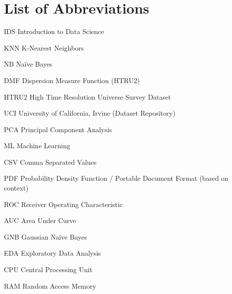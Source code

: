 \chapter*{List of Abbreviations}

\begin{abbrv}

    \item[IDS]        Introduction to Data Science
    \item[KNN]        K-Nearest Neighbors
    \item[NB]         Naïve Bayes
    \item[DMF]        Dispersion Measure Function (HTRU2)
    \item[HTRU2]      High Time Resolution Universe Survey Dataset
    \item[UCI]        University of California, Irvine (Dataset Repository)
    \item[PCA]        Principal Component Analysis
    \item[ML]         Machine Learning
    \item[CSV]        Comma Separated Values
    \item[PDF]        Probability Density Function / Portable Document Format (based on context)
    \item[ROC]        Receiver Operating Characteristic
    \item[AUC]        Area Under Curve
    \item[GNB]        Gaussian Naïve Bayes
    \item[EDA]        Exploratory Data Analysis
    \item[CPU]        Central Processing Unit
    \item[RAM]        Random Access Memory

\end{abbrv}